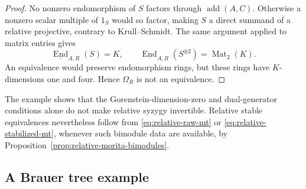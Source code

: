 \documentclass[12pt,a4paper,english,reqno]{amsart}
\numberwithin{equation}{section}
\theoremstyle{plain}
\theoremstyle{definition}
\begin{document}
\begin{proof}
No nonzero endomorphism of $S$ factors through
$\operatorname{add}(A,C)$.  Otherwise a nonzero scalar multiple
of $1_S$ would so factor, making $S$ a direct summand of a
relative projective, contrary to Krull--Schmidt.  The same
argument applied to matrix entries gives
\[
 \underline{\operatorname{End}}_{A,R}(S)=K,
 \qquad
 \underline{\operatorname{End}}_{A,R}(S^{\oplus2})
       =\operatorname{Mat}_2(K).
\]
An equivalence would preserve endomorphism rings, but these
rings have $K$-dimensions one and four.  Hence $\Omega_R$
is not an equivalence.
\end{proof}

The example shows that the Gorenstein-dimension-zero and
dual-generator conditions alone do not make relative syzygy
invertible.  Relative stable equivalences nevertheless follow
from \eqref{eq:relative-raw-mt} or
\eqref{eq:relative-stabilized-mt}, whenever such bimodule data
are available, by Proposition~\ref{prop:relative-morita-bimodules}.

\subsection{A Brauer tree example}
\end{document}

